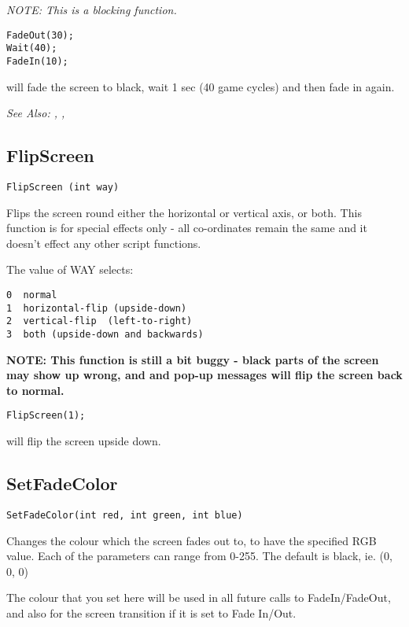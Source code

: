 \it{NOTE: This is a blocking function.}

\begin{verbatim}
FadeOut(30);
Wait(40);
FadeIn(10);
\end{verbatim}
will fade the screen to black, wait 1 sec (40 game cycles) and then fade in again.

\it{See Also:} , ,


\subsection{FlipScreen}\label{FlipScreen}%

\begin{verbatim}
FlipScreen (int way)
\end{verbatim}
Flips the screen round either the horizontal or vertical axis, or both.
This function is for special effects only - all co-ordinates remain the
same and it doesn't effect any other script functions.

The value of WAY selects:
\begin{verbatim}
0  normal
1  horizontal-flip (upside-down)
2  vertical-flip  (left-to-right)
3  both (upside-down and backwards)
\end{verbatim}
\bf{NOTE}: This function is still a bit buggy - black parts of the screen may
show up wrong, and and pop-up messages will flip the screen back to normal.

\begin{verbatim}
FlipScreen(1);
\end{verbatim}
will flip the screen upside down.


\subsection{SetFadeColor}\label{SetFadeColor}%

\begin{verbatim}
SetFadeColor(int red, int green, int blue)
\end{verbatim}

Changes the colour which the screen fades out to, to have the specified RGB value. Each of the
parameters can range from 0-255. The default is black, ie. (0, 0, 0)

The colour that you set here will be used in all future calls to FadeIn/FadeOut, and also
for the screen transition if it is set to Fade In/Out.

